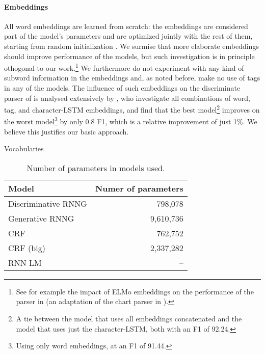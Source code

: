     \paragraph{Embeddings}
    \label{sec:impl-embedding}
    All word embeddings are learned from scratch: the embeddings are considered part of the model's parameters and are optimized jointly with the rest of them, starting from random initialization \citep{glorot2010understanding}. We surmise that more elaborate embeddings should improve performance of the models, but such investigation is in principle othogonal to our work.\footnote{See for example the impact of ELMo embeddings \citep{peters2018elmo} on the performance of the parser in \citet{kitaev2018attentive} (an adaptation of the chart parser in \citet{stern2017minimal}).} We furthermore do not experiment with any kind of subword information in the embeddings and, as noted before, make no use of tags in any of the models. The influence of such embeddings on the discriminate parser of \citet{stern2017minimal} is analysed extensively by \citet{stern2018analyis}, who investigate all combinations of word, tag, and character-LSTM embeddings, and find that the best model\footnote{A tie between the model that uses all embeddings concatenated and the model that uses just the character-LSTM, both with an F1 of 92.24.} improves on the worst model\footnote{Using only word embeddings, at an F1 of 91.44.} by only 0.8 F1, which is a relative improvement of just 1\%. We believe this justifies our basic approach.

    \begin{table}
      \caption{Vocabularies}
      \label{tab:vocabularies}
    \end{table}

    \begin{table}[h]
    \center
      \begin{tabular}{l|r}
          Model  & Numer of parameters \\ \hline
          Discriminative RNNG & 798,078  \\
          Generative RNNG & 9,610,736  \\
          CRF & 762,752  \\
          CRF (big) & 2,337,282  \\
          RNN LM & -- \\
      \end{tabular}
      \caption{Number of parameters in models used.}
      \label{tab:num-params}
    \end{table}


